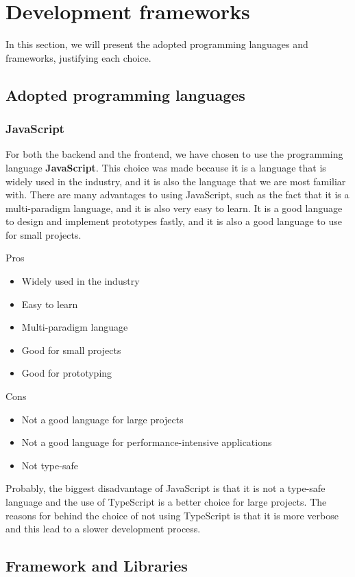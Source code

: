 \section{Development frameworks}
In this section, we will present the adopted programming languages and frameworks, justifying each choice.
\subsection{Adopted programming languages}

\subsubsection{JavaScript}
For both the backend and the frontend, we have chosen to use the programming language \textbf{JavaScript}.
This choice was made because it is a language that is widely used in the industry, and it is also the language that we are most familiar with.
There are many advantages to using JavaScript, such as the fact that it is a multi-paradigm language, and it is also very easy to learn.
It is a good language to design and implement prototypes fastly, and it is also a good language to use for small projects.

Pros
\begin{itemize}
    \item Widely used in the industry
    \item Easy to learn
    \item Multi-paradigm language
    \item Good for small projects
    \item Good for prototyping
\end{itemize}


Cons
\begin{itemize}
    \item Not a good language for large projects
    \item Not a good language for performance-intensive applications
    \item Not type-safe
\end{itemize}


Probably, the biggest disadvantage of JavaScript is that it is not a type-safe language and the use of TypeScript is a better choice for large projects.
The reasons for behind the choice of not using TypeScript is that it is more verbose and this lead to a slower development process.

\subsection{Framework and Libraries}
